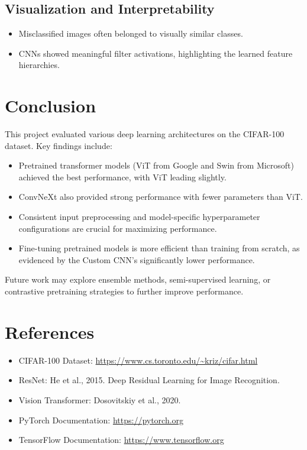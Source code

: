 \documentclass[11pt]{article}
\begin{document}
\subsection*{Visualization and Interpretability}
\begin{itemize}
    \item Misclassified images often belonged to visually similar classes.
    \item CNNs showed meaningful filter activations, highlighting the learned feature hierarchies.
\end{itemize}

\section{Conclusion}

This project evaluated various deep learning architectures on the CIFAR-100 dataset. Key findings include:
\begin{itemize}
    \item Pretrained transformer models (ViT from Google and Swin from Microsoft) achieved the best performance, with ViT leading slightly.
    \item ConvNeXt also provided strong performance with fewer parameters than ViT.
    \item Consistent input preprocessing and model-specific hyperparameter configurations are crucial for maximizing performance.
    \item Fine-tuning pretrained models is more efficient than training from scratch, as evidenced by the Custom CNN's significantly lower performance.
\end{itemize}

Future work may explore ensemble methods, semi-supervised learning, or contrastive pretraining strategies to further improve performance.

\section*{References}

\begin{itemize}
    \item CIFAR-100 Dataset: \url{https://www.cs.toronto.edu/~kriz/cifar.html}
    \item ResNet: He et al., 2015. Deep Residual Learning for Image Recognition.
    \item Vision Transformer: Dosovitskiy et al., 2020.
    \item PyTorch Documentation: \url{https://pytorch.org}
    \item TensorFlow Documentation: \url{https://www.tensorflow.org}
\end{itemize}
\end{document}
